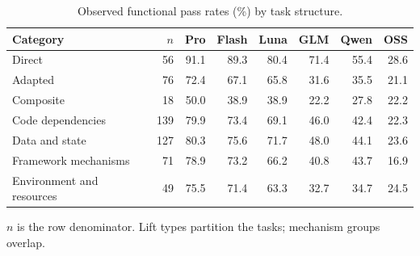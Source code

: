 \begin{table}[tbp]
  \centering
  \footnotesize
  \caption{Observed functional pass rates (\%) by task structure.}
  \label{tab:structure}
  \setlength{\tabcolsep}{4.2pt}
  \renewcommand{\arraystretch}{1.10}
  \begin{tabular}{@{}lrrrrrrr@{}}
    \toprule
    Category & $n$ & Pro & Flash & Luna & GLM & Qwen & OSS \\
    \midrule
    Direct & 56 & 91.1 & 89.3 & 80.4 & 71.4 & 55.4 & 28.6 \\
    Adapted & 76 & 72.4 & 67.1 & 65.8 & 31.6 & 35.5 & 21.1 \\
    Composite & 18 & 50.0 & 38.9 & 38.9 & 22.2 & 27.8 & 22.2 \\
    \midrule
    Code dependencies & 139 & 79.9 & 73.4 & 69.1 & 46.0 & 42.4 & 22.3 \\
    Data and state & 127 & 80.3 & 75.6 & 71.7 & 48.0 & 44.1 & 23.6 \\
    Framework mechanisms & 71 & 78.9 & 73.2 & 66.2 & 40.8 & 43.7 & 16.9 \\
    Environment and resources & 49 & 75.5 & 71.4 & 63.3 & 32.7 & 34.7 & 24.5 \\
    \bottomrule
  \end{tabular}
  \par\smallskip\begin{minipage}{\linewidth}\scriptsize
  $n$ is the row denominator. Lift types partition the tasks; mechanism groups overlap.
  \end{minipage}
\end{table}
